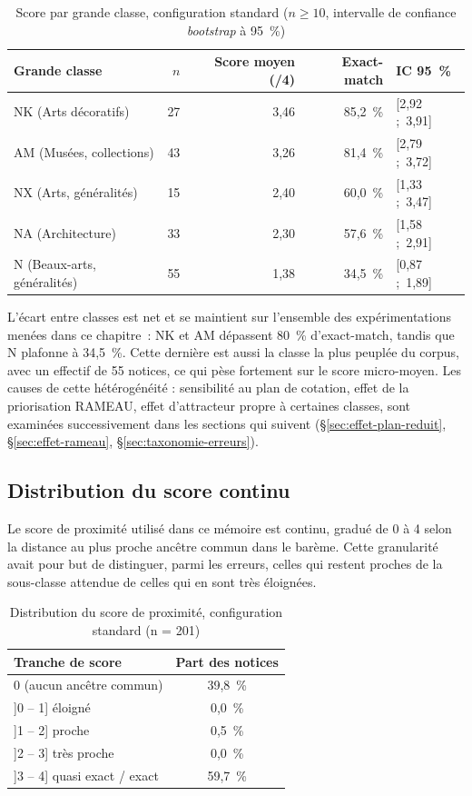 \begin{table}[h]
\centering
\begin{tabular}{lrrrl}
\toprule
\textbf{Grande classe} & \textbf{$n$} & \textbf{Score moyen (/4)} & \textbf{Exact-match} & \textbf{IC 95~\%} \\
\midrule
NK (Arts décoratifs)        & 27 & 3,46 & 85,2~\% & [2,92 ;~3,91] \\
AM (Musées, collections)    & 43 & 3,26 & 81,4~\% & [2,79 ;~3,72] \\
NX (Arts, généralités)      & 15 & 2,40 & 60,0~\% & [1,33 ;~3,47] \\
NA (Architecture)           & 33 & 2,30 & 57,6~\% & [1,58 ;~2,91] \\
N (Beaux-arts, généralités) & 55 & 1,38 & 34,5~\% & [0,87 ;~1,89] \\
\bottomrule
\end{tabular}
\caption{Score par grande classe, configuration standard ($n \geq 10$, intervalle de confiance \textit{bootstrap}  à 95~\%)}
\label{tab:score-grande-classe}
\end{table}

L'écart entre classes est net et se maintient sur l'ensemble des expérimentations menées dans ce chapitre~: NK et AM dépassent 80~\% d'exact-match, tandis que N plafonne à 34,5~\%. Cette dernière est aussi la classe la plus peuplée du corpus, avec un effectif de 55 notices, ce qui pèse fortement sur le score micro-moyen. Les causes de cette hétérogénéité : sensibilité au plan de cotation, effet de la priorisation RAMEAU, effet d'attracteur propre à certaines classes, sont examinées successivement dans les sections qui suivent (\S\ref{sec:effet-plan-reduit}, \S\ref{sec:effet-rameau}, \S\ref{sec:taxonomie-erreurs}).

\subsection{Distribution du score continu}
\label{sec:distribution-score}

Le score de proximité utilisé dans ce mémoire est continu, gradué de 0 à 4 selon la distance au plus proche ancêtre commun dans le barème. Cette granularité avait pour but de distinguer, parmi les erreurs, celles qui restent proches de la sous-classe attendue de celles qui en sont très éloignées.

\begin{table}[h]
\centering
\begin{tabular}{lc}
\toprule
\textbf{Tranche de score} & \textbf{Part des notices} \\
\midrule
0 (aucun ancêtre commun) & 39,8~\% \\
]0 -- 1] éloigné & 0,0~\% \\
]1 -- 2] proche & 0,5~\% \\
]2 -- 3] très proche & 0,0~\% \\
]3 -- 4] quasi exact / exact & 59,7~\% \\
\bottomrule
\end{tabular}
\caption{Distribution du score de proximité, configuration standard (n = 201)}
\label{tab:distribution-score}
\end{table}

